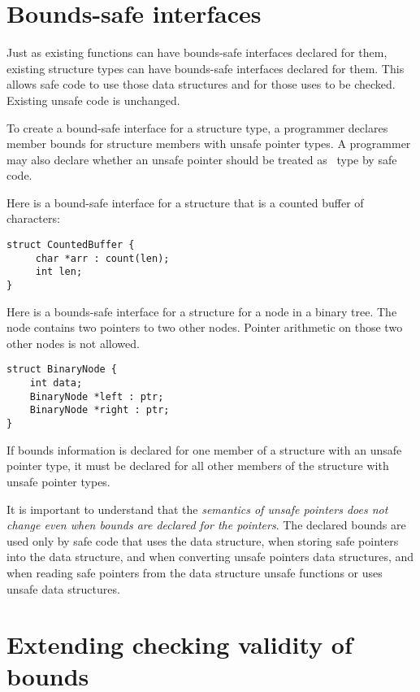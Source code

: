 \section{Bounds-safe interfaces}
\label{section:structure-bounds-safe-interfaces}

Just as existing functions can have bounds-safe interfaces declared for
them, existing structure types can have bounds-safe interfaces declared
for them. This allows safe code to use those data structures and for
those uses to be checked. Existing unsafe code is unchanged.

To create a bound-safe interface for a structure type, a programmer
declares member bounds for structure members with unsafe pointer types.
A programmer may also declare whether an unsafe pointer should be
treated as \ptr\ type by safe code.

Here is a bound-safe interface for a structure that is a counted buffer
of characters:

\begin{verbatim}
struct CountedBuffer {
     char *arr : count(len);
     int len;
}
\end{verbatim}

Here is a bounds-safe interface for a structure for a node in a
binary tree. The node contains two pointers to two other nodes. Pointer
arithmetic on those two other nodes is not allowed.

\begin{verbatim}
struct BinaryNode {
    int data;
    BinaryNode *left : ptr;
    BinaryNode *right : ptr;
}
\end{verbatim}

If bounds information is declared for one member of a structure with an
unsafe pointer type, it must be declared for all other members of the
structure with unsafe pointer types.

It is important to understand that the \emph{semantics of unsafe
pointers does not change even when bounds are declared for the
pointers}. The declared bounds are used only by safe code that uses the
data structure, when storing safe pointers into the data structure, and
when converting unsafe pointers data structures, and when reading safe
pointers from the data structure unsafe functions or uses unsafe data
structures.

\section{Extending checking validity of bounds}
\label{section:checking-bounds-with-structures}

